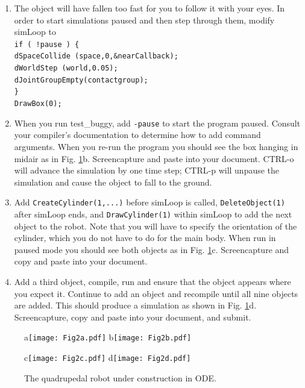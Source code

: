 \documentclass[12pt]{article}
\begin{document}
\begin{enumerate}
\item The object will have fallen too fast for you to follow it with your eyes. In order to start simulations paused and then step through them, modify simLoop to\\
\texttt{if ( !pause ) \{}\\
\texttt{dSpaceCollide (space,0,\&nearCallback);}\\
\texttt{dWorldStep (world,0.05);}\\
\texttt{dJointGroupEmpty(contactgroup);}\\
\texttt{\}}\\
\texttt{DrawBox(0);}\\

\item When you run test\_buggy, add \texttt{-pause} to start the program paused. Consult your compiler's documentation to determine how to add command arguments. When you re-run the program you should see the box hanging in midair as in Fig. \ref{Fig2}b. Screencapture and paste into your document. CTRL-o will advance the simulation by one time step; CTRL-p will unpause the simulation and cause the object to fall to the ground.

\item Add \texttt{CreateCylinder(1,...)} before simLoop is called, \texttt{DeleteObject(1)} after simLoop ends, and \texttt{DrawCylinder(1)} within simLoop to add the next object to the robot. Note that you will have to specify the orientation of the cylinder, which you do not have to do for the main body. When run in paused mode you should see both objects as in Fig. \ref{Fig2}c. Screencapture and copy and paste into your document.

\item Add a third object, compile, run and ensure that the object appears where you expect it. Continue to add an object and recompile until all nine objects are added. This should produce a simulation as shown in Fig. \ref{Fig2}d. Screencapture, copy and paste into your document, and submit.
\end{enumerate}

\begin{figure}[!t]
\centerline{
a\texttt{[image: Fig2a.pdf]}
b\texttt{[image: Fig2b.pdf]}
}
\centerline{
c\texttt{[image: Fig2c.pdf]}
d\texttt{[image: Fig2d.pdf]}
}
\caption{The quadrupedal robot under construction in ODE.}
\label{Fig2}
\end{figure}
\end{document}
